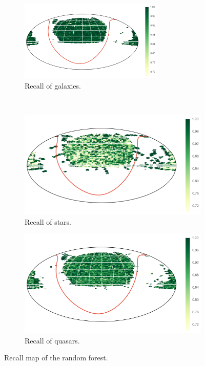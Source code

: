 \begin{figure}[p]
	\centering
	\begin{subfigure}{\textwidth}
		\centering
		\includegraphics[width=0.75\textwidth]{figures/4_expt1/map_recall_forest_all_Galaxy}
		\caption{Recall of galaxies.}
		\label{fig:map_recall_forest_all_Galaxy}
	\end{subfigure}\\
	\begin{subfigure}{\textwidth}
		\centering
		\includegraphics[width=0.75\linewidth]{figures/4_expt1/map_recall_forest_all_Star}
		\caption{Recall of stars.}
		\label{fig:map_recall_forest_all_Star}
	\end{subfigure}
	\begin{subfigure}{\textwidth}
		\centering
		\includegraphics[width=0.75\linewidth]{figures/4_expt1/map_recall_forest_all_Quasar}
		\caption{Recall of quasars.}
		\label{fig:map_recall_forest_all_Quasar}
	\end{subfigure}
	\caption{Recall map of the random forest.}
	\label{fig:map_recall_forest_all}
\end{figure}



